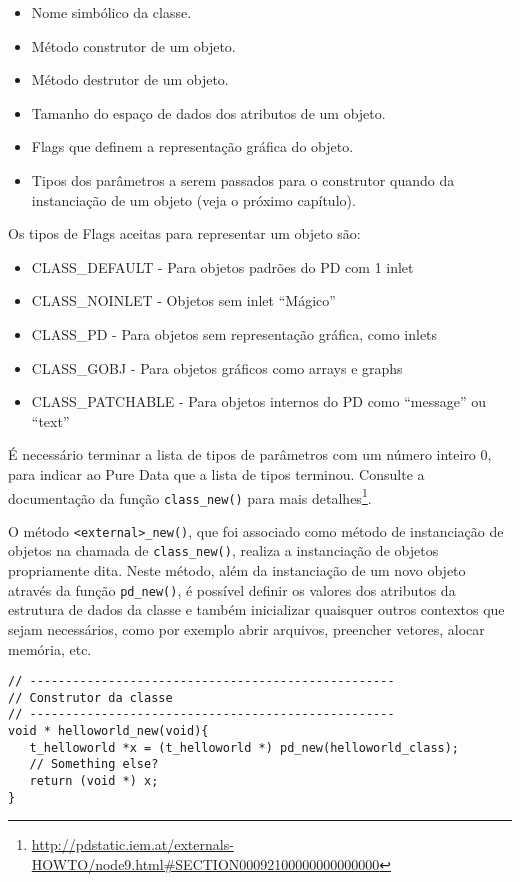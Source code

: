 \begin{itemize}
\item Nome simbólico da classe.
\item Método construtor de um objeto.
\item Método destrutor de um objeto.
\item Tamanho do espaço de dados dos atributos de um objeto.
\item Flags que definem a representação gráfica do objeto.
\item Tipos dos parâmetros a serem passados para o construtor quando da
      instanciação de um objeto (veja o próximo capítulo).
\end{itemize}

Os tipos de Flags aceitas para representar um objeto são:
\begin{itemize}
   \item CLASS\_DEFAULT - Para objetos padrões do PD com 1 inlet
   \item CLASS\_NOINLET - Objetos sem inlet ``Mágico''
   \item CLASS\_PD - Para objetos sem representação gráfica, como inlets
   \item CLASS\_GOBJ - Para objetos gráficos como arrays e graphs
   \item CLASS\_PATCHABLE - Para objetos internos do PD como ``message'' ou ``text''
\end{itemize}

É necessário terminar a lista de tipos de parâmetros com um número inteiro 0,
para indicar ao Pure Data que a lista de tipos terminou.
Consulte a documentação da função \texttt{class\_new()} para mais
detalhes\footnote{\url{http://pdstatic.iem.at/externals-HOWTO/node9.html\#SECTION00092100000000000000}}.

O método \texttt{<external>\_new()}, que foi associado como método de
instanciação de objetos na chamada de \texttt{class\_new()}, realiza a
instanciação de objetos propriamente dita.
Neste método, além da instanciação de um novo objeto através da função
\texttt{pd\_new()}, é possível definir os
valores dos atributos da estrutura de dados da classe e também inicializar
quaisquer outros contextos que sejam necessários, como por exemplo abrir
arquivos, preencher vetores, alocar memória, etc.

\vspace{1em}
\begin{lstlisting}[caption=Construtor de uma classe]
// ---------------------------------------------------
// Construtor da classe
// ---------------------------------------------------
void * helloworld_new(void){
   t_helloworld *x = (t_helloworld *) pd_new(helloworld_class);
   // Something else?
   return (void *) x;
}
\end{lstlisting}

